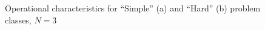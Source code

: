 \documentclass[preprint]{elsarticle}
\begin{document}
\begin{figure}[h!]
	\begin{minipage}[h]{0.48\linewidth}
	\end{minipage}
	\hfill
	\begin{minipage}[h]{0.48\linewidth}
	\end{minipage}
	\caption{Operational characteristics for “Simple” (a) and “Hard” (b) problem classes, $N = 3$}
	\label{fig:operational_characteristics_N=3}
\end{figure}
\end{document}
